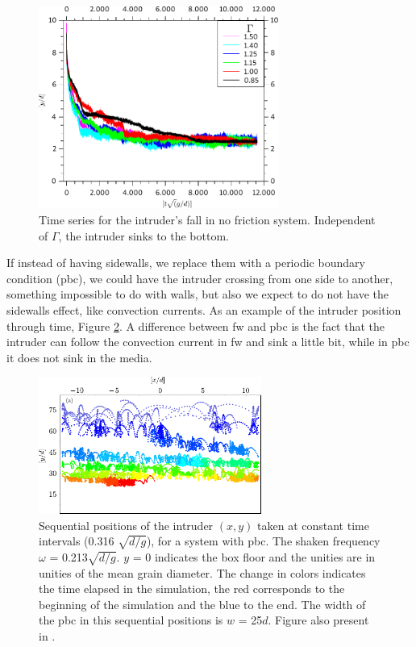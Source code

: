 \begin{figure}[H]
    \centering
    \includegraphics[width=0.7\textwidth]{04-figuras/BNE25000semAtrito.pdf}
    \caption[Frictionless grains and walls.]{Time series for the intruder's fall in no friction system. Independent of $\Gamma$, the intruder sinks to the bottom.}
    \label{fig:BNE25000_sem_Atrito}
\end{figure}

    If instead of having sidewalls, we replace them with a periodic boundary condition (pbc), we could have the intruder crossing from one side to another, something impossible to do with walls, but also we expect to do not have the sidewalls effect, like convection currents. As an example of the intruder position through time, Figure \ref{fig:BNE_intruderpbc}. A difference between fw and pbc is the fact that the intruder can follow the convection current in fw and sink a little bit, while in pbc it does not sink in the media.

\begin{figure}[H]
    \centering
    \includegraphics[width=0.65\textwidth]{04-figuras/BNE_PositionPBC.pdf}
    \caption[BNE with periodic boundary: sample of intruder positions.]{Sequential positions of the intruder $(x, y)$ taken at constant time intervals (0.316 $\sqrt{d/g}$), for a system with pbc. The shaken frequency $\omega$ = 0.213$\sqrt{d/g}$. $y$ = 0 indicates the box floor and the unities are in unities of the mean grain diameter. The change in colors indicates the time elapsed in the simulation, the red corresponds to the beginning of the simulation and the blue to the end. The width of the pbc in this sequential positions is $w$ = 25$d$. Figure also present in \cite{Large-deviation_quantification_of_boundary_conditions_on_the_Brazil_nut_effect}.}
    \label{fig:BNE_intruderpbc}
\end{figure}

